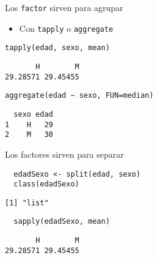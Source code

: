 \documentclass[xcolor={usenames,svgnames,dvipsnames}]{beamer}
\begin{document}
\begin{frame}[fragile,label={sec:org3d660f4}]{Los \texttt{factor} sirven para agrupar}
 \begin{itemize}
\item Con \texttt{tapply} o \texttt{aggregate}
\end{itemize}
\lstset{language=r,label= ,caption= ,captionpos=b,numbers=none}
\begin{lstlisting}
tapply(edad, sexo, mean)
\end{lstlisting}

\begin{verbatim}
       H        M 
29.28571 29.45455
\end{verbatim}

\lstset{language=r,label= ,caption= ,captionpos=b,numbers=none}
\begin{lstlisting}
aggregate(edad ~ sexo, FUN=median)
\end{lstlisting}

\begin{verbatim}
  sexo edad
1    H   29
2    M   30
\end{verbatim}
\end{frame}

\begin{frame}[fragile,label={sec:orgda3c5ae}]{Los factores sirven para separar}
 \lstset{language=r,label= ,caption= ,captionpos=b,numbers=none}
\begin{lstlisting}
  edadSexo <- split(edad, sexo)
  class(edadSexo)
\end{lstlisting}

\begin{verbatim}
[1] "list"
\end{verbatim}

\lstset{language=r,label= ,caption= ,captionpos=b,numbers=none}
\begin{lstlisting}
  sapply(edadSexo, mean)
\end{lstlisting}

\begin{verbatim}
       H        M 
29.28571 29.45455
\end{verbatim}
\end{frame}
\end{document}
